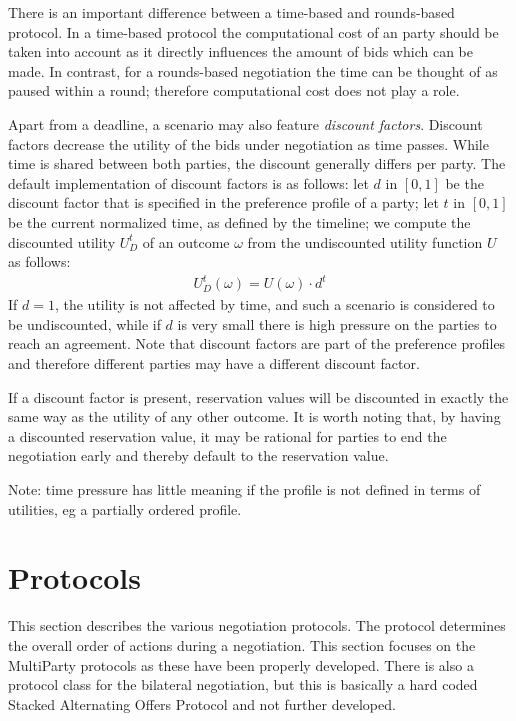 \documentclass[]{article}
\begin{document}
There is an important difference between a time-based and rounds-based protocol. In a time-based protocol the computational cost of an party should be taken into account as it directly influences the amount of bids which can be made. In contrast, for a rounds-based negotiation the time can be thought of as paused within a round; therefore computational cost does not play a role.

Apart from a deadline, a scenario may also feature \emph{discount factors}. Discount factors decrease the utility of the bids under negotiation as time passes. While time is shared between both parties, the discount generally differs per party. 
The default implementation of discount factors is as follows: let $d$ in $[0, 1]$ be the discount factor that is specified in the preference profile of a party; let $t$ in $[0, 1]$ be the current normalized time, as defined by the timeline; we compute the discounted utility $U_D^t$ of an outcome $\omega$ from the undiscounted utility function $U$ as follows:
\begin{eqnarray}
U_D^t(\omega) = U(\omega) \cdot d^t
\end{eqnarray}
If $d = 1$, the utility is not affected by time, and such a scenario is considered to be undiscounted, while if $d$ is very small there is high pressure on the parties to reach an agreement. Note that discount factors are part of the preference profiles and therefore different parties may have a different discount factor.

If a discount factor is present, reservation values will be discounted in exactly the same way as the utility of any other outcome. It is worth noting that, by having a discounted reservation value, it may be rational for parties to end the negotiation early and thereby default to the reservation value.

Note: time pressure has little meaning if the profile is not defined in terms of utilities, eg a partially ordered profile.
 
\section{Protocols}\label{sec:protocols}
This section describes the various negotiation protocols. The protocol determines the overall order of actions during a negotiation.
This section focuses on the MultiParty protocols as these have been properly developed. There is also a protocol class for the bilateral negotiation, but this is basically a hard coded Stacked Alternating Offers Protocol and not further developed. 
\end{document}

